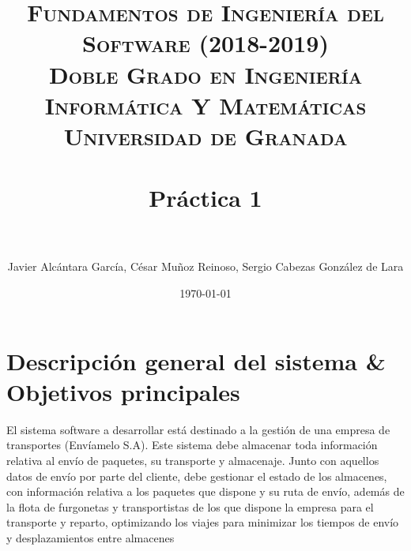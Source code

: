 



\title{	
\normalfont \normalsize 
\textsc{\textbf{Fundamentos de Ingeniería del Software (2018-2019)} \\ Doble Grado en Ingeniería Informática Y Matemáticas \\ Universidad de Granada} \\ [25pt] %
\horrule{0.5pt} \\[0.4cm] %
\huge Práctica 1 \\ %
\horrule{2pt} \\[0.5cm] %
}

\author{Javier Alcántara García, César Muñoz Reinoso, Sergio Cabezas González de Lara} %

\date{\normalsize\today} %





\maketitle %

\newpage %

\tableofcontents %

\listoffigures

\listoftables

\newpage


\section{Descripción general del sistema \& Objetivos principales}
El sistema software a desarrollar está destinado a la gestión de una empresa de transportes (Envíamelo S.A). Este sistema debe almacenar toda información relativa al envío de paquetes, su transporte y almacenaje. Junto con aquellos datos de envío por parte del cliente, debe gestionar el estado de los almacenes, con información relativa a los paquetes que dispone y su ruta de envío, además de la flota de furgonetas y transportistas de los que dispone la empresa para el transporte y reparto, optimizando los viajes para minimizar los tiempos de envío y desplazamientos entre almacenes

